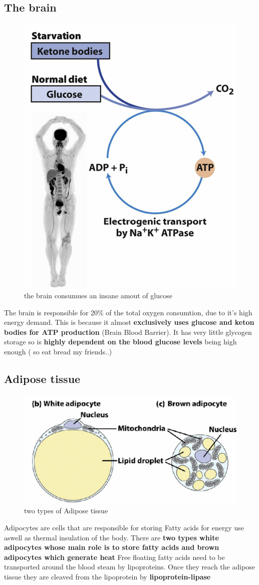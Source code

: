 \documentclass[../main.tex]{subfiles}
\begin{document}
\subsection{The brain}
\begin{figure}[H]
    \centering
    \includegraphics[width=0.5\linewidth]{theBrain.png}
    \caption{the brain consumues an insane amout of glucose}
    \label{fig:enter-label}
\end{figure}
The brain is responsible for 20\% of the total oxygen consumtion, due to it's high energy demand. This is because it almost \textbf{exclusively uses glucose and keton bodies for ATP production} (Brain Blood Barrier). It has very little glycogen storage so is \textbf{highly dependent on the blood glucose levels} being high enough ( so eat bread my friends..)
\subsection{Adipose tissue}
\begin{figure}[H]
    \centering
    \includegraphics[width=0.5\linewidth]{adiposeTissue.png}
    \caption{two types of Adipose tissue}
    \label{fig:enter-label}
\end{figure}
Adipocytes are cells that are responsible for storing Fatty acids for energy use aswell as thermal insulation of the body. There are \textbf{two types white adipocytes whose main role is to store fatty acids and brown adipocytes which generate heat} Free floating fatty acids need to be transported around the blood steam by lipoproteins. Once they reach the adipose tissue they are cleaved from the lipoprotein by \textbf{\gls{lipoprotein-lipase}}
\end{document}
